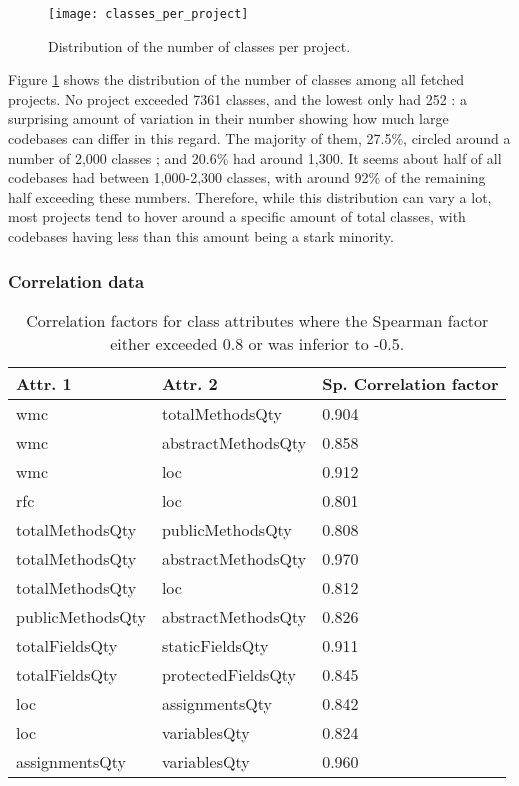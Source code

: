 \documentclass[12pt]{article}
\begin{document}
\begin{figure}[h!]
	\centering
	\texttt{[image: classes\_per\_project]}
	\captionsetup{justification=centering}
	\caption{Distribution of the number of classes per project.}
	\label{fig:classes_per_project}
\end{figure}

\bigskip
Figure \ref{fig:classes_per_project} shows the distribution of the number of classes among all fetched projects. No project exceeded 7361 classes, and the lowest only had 252 : a surprising amount of variation in their number showing how much large codebases can differ in this regard. The majority of them, 27.5\%, circled around a number of 2,000 classes ; and 20.6\% had around 1,300. It seems about half of all codebases had between 1,000-2,300 classes, with around 92\% of the remaining half exceeding these numbers. Therefore, while this distribution can vary a lot, most projects tend to hover around a specific amount of total classes, with codebases having less than this amount being a stark minority.

\clearpage
\subsubsection{Correlation data}

\begin{table}[h!]
	\centering
	\begin{tabular}{l|l|l}
		Attr. 1 & Attr. 2 & Sp. Correlation factor \\ \hline
		wmc & totalMethodsQty & 0.904 \\
		wmc & abstractMethodsQty & 0.858 \\
		wmc & loc & 0.912 \\
		rfc & loc & 0.801 \\
		totalMethodsQty & publicMethodsQty & 0.808 \\
		totalMethodsQty & abstractMethodsQty & 0.970 \\
		totalMethodsQty & loc & 0.812 \\
		publicMethodsQty & abstractMethodsQty & 0.826 \\
		totalFieldsQty & staticFieldsQty & 0.911 \\
		totalFieldsQty & protectedFieldsQty & 0.845 \\
		loc & assignmentsQty & 0.842 \\
		loc & variablesQty & 0.824 \\
		assignmentsQty & variablesQty & 0.960 \\
	\end{tabular}
	\captionsetup{justification=centering}
	\caption{Correlation factors for class attributes where the Spearman factor either exceeded 0.8 or was inferior to -0.5.}
	\label{table:spearmancorrelation}
\end{table}
\end{document}
